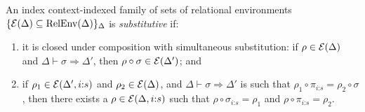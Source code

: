 \begin{definition}
  \label{defn:valid-rel-env-family}
  An index context-indexed family of sets of relational environments
  $\{ \mathcal{E}(\Delta) \subseteq \mathrm{RelEnv}(\Delta) \}_\Delta$
  is \emph{substitutive} if:
  \begin{enumerate}
  \item it is closed under composition with simultaneous substitution:
    if $\rho \in \mathcal{E}(\Delta)$ and $\Delta \vdash \sigma
    \Rightarrow \Delta'$, then $\rho \circ \sigma \in
    \mathcal{E}(\Delta')$; and
  \item if $\rho_1 \in \mathcal{E}(\Delta', i\mathord:s)$ and $\rho_2
    \in \mathcal{E}(\Delta)$, and $\Delta \vdash \sigma \Rightarrow
    \Delta'$ is such that $\rho_1 \circ \pi_{i\mathord:s} = \rho_2
    \circ \sigma$, then there exists a $\rho \in \mathcal{E}(\Delta,
    i\mathord:s)$ such that $\rho \circ \sigma_{i\mathord:s} =
    \rho_1$ and $\rho \circ \pi_{i\mathord:s} = \rho_2$.
  \end{enumerate}
\end{definition}
